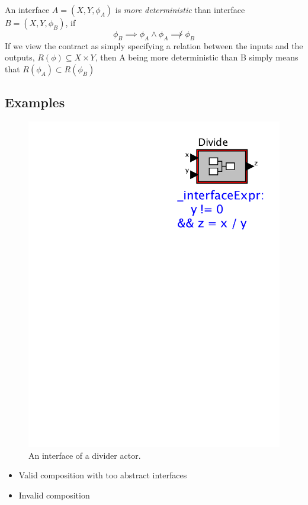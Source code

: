\documentclass[preprint,11pt,authoryear]{sigplanconf}
\begin{document}
An interface $A=(X,Y,\phi_A)$ is \emph{more deterministic} than interface $B=(X,Y,\phi_B)$, if
\[
\phi_B \implies \phi_A \wedge \phi_A \not\implies \phi_B
\]
If we view the contract as simply specifying a relation between the inputs and the outputs, $R(\phi) \subseteq X \times Y$, then A being more deterministic than B simply means that
$R(\phi_A) \subset R(\phi_B)$


\subsection{Examples}
\begin{figure}[htbp]
\centering
\includegraphics[width=\columnwidth]{figs/Divide2} 
\caption{An interface of a divider actor.}
\label{fig:divider}
\end{figure}

\begin{itemize}
	\item Valid composition with too abstract interfaces
	\item Invalid composition
\end{itemize}
\end{document}
